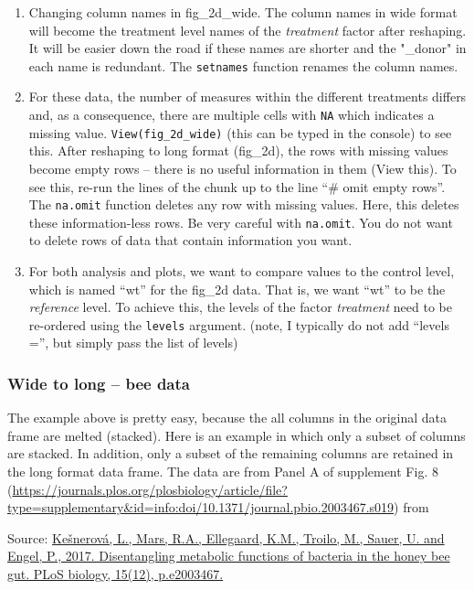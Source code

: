 \documentclass[]{book}
\begin{document}
\begin{enumerate}
\def\labelenumi{\arabic{enumi}.}
\item
  Changing column names in fig\_2d\_wide. The column names in wide format will become the treatment level names of the \emph{treatment} factor after reshaping. It will be easier down the road if these names are shorter and the "\_donor" in each name is redundant. The \texttt{setnames} function renames the column names.
\item
  For these data, the number of measures within the different treatments differs and, as a consequence, there are multiple cells with \texttt{NA} which indicates a missing value. \texttt{View(fig\_2d\_wide)} (this can be typed in the console) to see this. After reshaping to long format (fig\_2d), the rows with missing values become empty rows -- there is no useful information in them (View this). To see this, re-run the lines of the chunk up to the line ``\# omit empty rows''. The \texttt{na.omit} function deletes any row with missing values. Here, this deletes these information-less rows. Be very careful with \texttt{na.omit}. You do not want to delete rows of data that contain information you want.
\item
  For both analysis and plots, we want to compare values to the control level, which is named ``wt'' for the fig\_2d data. That is, we want ``wt'' to be the \emph{reference} level. To achieve this, the levels of the factor \emph{treatment} need to be re-ordered using the \texttt{levels} argument. (note, I typically do not add ``levels ='', but simply pass the list of levels)
\end{enumerate}

\hypertarget{wide-to-long-bee-data}{%
\subsubsection{Wide to long -- bee data}\label{wide-to-long-bee-data}}

The example above is pretty easy, because the all columns in the original data frame are melted (stacked). Here is an example in which only a subset of columns are stacked. In addition, only a subset of the remaining columns are retained in the long format data frame. The data are from Panel A of supplement Fig. 8 (\url{https://journals.plos.org/plosbiology/article/file?type=supplementary\&id=info:doi/10.1371/journal.pbio.2003467.s019}) from

Source: \href{https://journals.plos.org/plosbiology/article?id=10.1371/journal.pbio.2003467}{Kešnerová, L., Mars, R.A., Ellegaard, K.M., Troilo, M., Sauer, U. and Engel, P., 2017. Disentangling metabolic functions of bacteria in the honey bee gut. PLoS biology, 15(12), p.e2003467.}
\end{document}
